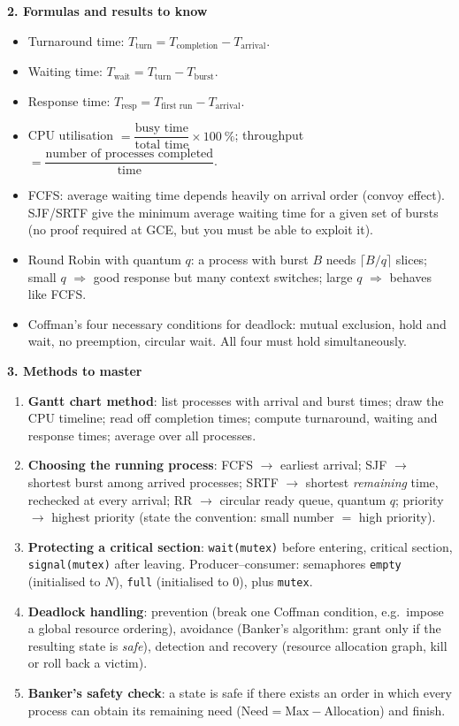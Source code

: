 \documentclass[11pt]{article}
\newcommand{\cle}[1]{{\popxbold\color{popdark}#1}}
\begin{document}
\begin{bilan}
\textbf{2. Formulas and results to know}
\begin{itemize}
\item Turnaround time: $T_{\text{turn}} = T_{\text{completion}} - T_{\text{arrival}}$.
\item Waiting time: $T_{\text{wait}} = T_{\text{turn}} - T_{\text{burst}}$.
\item Response time: $T_{\text{resp}} = T_{\text{first run}} - T_{\text{arrival}}$.
\item CPU utilisation $= \dfrac{\text{busy time}}{\text{total time}} \times 100\ \%$; throughput $= \dfrac{\text{number of processes completed}}{\text{time}}$.
\item FCFS: average waiting time depends heavily on arrival order (convoy effect). SJF/SRTF give the minimum average waiting time for a given set of bursts (no proof required at GCE, but you must be able to exploit it).
\item Round Robin with quantum $q$: a process with burst $B$ needs $\lceil B/q \rceil$ slices; small $q$ $\Rightarrow$ good response but many context switches; large $q$ $\Rightarrow$ behaves like FCFS.
\item Coffman's four \cle{necessary conditions} for deadlock: mutual exclusion, hold and wait, no preemption, circular wait. All four must hold simultaneously.
\end{itemize}

\textbf{3. Methods to master}
\begin{enumerate}
\item \textbf{Gantt chart method}: list processes with arrival and burst times; draw the CPU timeline; read off completion times; compute turnaround, waiting and response times; average over all processes.
\item \textbf{Choosing the running process}: FCFS $\to$ earliest arrival; SJF $\to$ shortest burst among arrived processes; SRTF $\to$ shortest \emph{remaining} time, rechecked at every arrival; RR $\to$ circular ready queue, quantum $q$; priority $\to$ highest priority (state the convention: small number $=$ high priority).
\item \textbf{Protecting a critical section}: \texttt{wait(mutex)} before entering, critical section, \texttt{signal(mutex)} after leaving. Producer--consumer: semaphores \texttt{empty} (initialised to $N$), \texttt{full} (initialised to $0$), plus \texttt{mutex}.
\item \textbf{Deadlock handling}: prevention (break one Coffman condition, e.g.\ impose a global resource ordering), avoidance (Banker's algorithm: grant only if the resulting state is \emph{safe}), detection and recovery (resource allocation graph, kill or roll back a victim).
\item \textbf{Banker's safety check}: a state is safe if there exists an order in which every process can obtain its remaining need ($\text{Need} = \text{Max} - \text{Allocation}$) and finish.
\end{enumerate}


\end{bilan}
\end{document}
